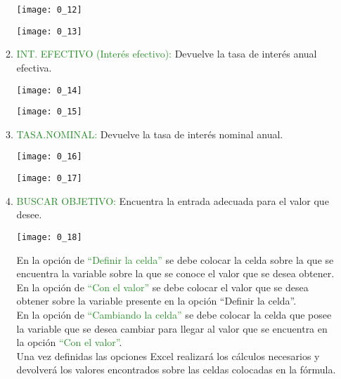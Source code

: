 \begin{enumerate}
\begin{enumerate}
		            \begin{center}
			            \texttt{[image: 0\_12]} \\
		            \end{center}
		            \begin{center}
			            \texttt{[image: 0\_13]}
		            \end{center}
		      \item \textcolor{ForestGreen}{INT. EFECTIVO (Interés efectivo):} Devuelve la tasa de interés anual efectiva.
		            \begin{center}
			            \texttt{[image: 0\_14]} \\
		            \end{center}
		            \begin{center}
			            \texttt{[image: 0\_15]}
		            \end{center}
		      \item \textcolor{ForestGreen}{TASA.NOMINAL:} Devuelve la tasa de interés nominal anual.
		            \begin{center}
			            \texttt{[image: 0\_16]} \\
		            \end{center}
		            \begin{center}
			            \texttt{[image: 0\_17]}
		            \end{center}
		      \item \textcolor{ForestGreen}{BUSCAR OBJETIVO:} Encuentra la entrada adecuada para el valor que desee.
		            \begin{center}
			            \texttt{[image: 0\_18]} \\
		            \end{center}
		            En la opción de \textcolor{ForestGreen}{“Definir la celda”} se debe colocar la celda sobre la que se encuentra la variable sobre la que se conoce el valor que se desea obtener. \\
		            En la opción de \textcolor{ForestGreen}{“Con el valor”} se debe colocar el valor que se desea obtener sobre la variable presente en la opción “Definir la celda”. \\
		            En la opción de \textcolor{ForestGreen}{“Cambiando la celda”} se debe colocar la celda que posee la variable que se desea cambiar para llegar al valor que se encuentra en la opción \textcolor{ForestGreen}{“Con el valor”}. \\
		            Una vez definidas las opciones Excel realizará los cálculos necesarios y devolverá los valores encontrados sobre las celdas colocadas en la fórmula. \\ \\
		            

\end{enumerate}
\end{enumerate}
